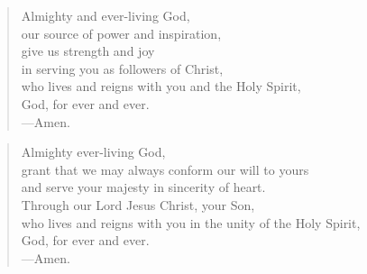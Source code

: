 \prayer

\setlength{\leftmargini}{\prayerleftmargini}

\begin{verse}
Almighty and ever-living God,\\
our source of power and inspiration,\\
give us strength and joy\\
in serving you as followers of Christ,\\
who lives and reigns with you and the Holy Spirit,\\
God, for ever and ever.\\
{\color{red}---\thinspace}Amen.
\end{verse}


\begin{verse}
Almighty ever-living God,\\
grant that we may always conform our will to yours\\
and serve your majesty in sincerity of heart.\\
Through our Lord Jesus Christ, your Son,\\
who lives and reigns with you in the unity of the Holy Spirit,\\
God, for ever and ever.\\
{\color{red}---\thinspace}Amen.
\end{verse}

\setlength{\leftmargini}{\defleftmargini}